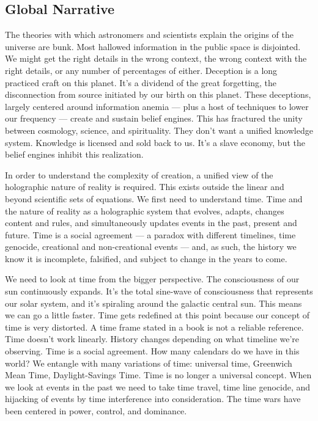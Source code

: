 \subsection{Global Narrative}\label{global-narrative}

The theories with which astronomers and scientists explain the origins
of the universe are bunk. Most hallowed information in the public space
is disjointed. We might get the right details in the wrong context, the
wrong context with the right details, or any number of percentages of
either. Deception is a long practiced craft on this planet. It's a
dividend of the great forgetting, the disconnection from source
initiated by our birth on this planet. These deceptions, largely
centered around information anemia --- plus a host of techniques to
lower our frequency --- create and sustain belief engines. This has
fractured the unity between cosmology, science, and spirituality. They
don't want a unified knowledge system. Knowledge is licensed and sold
back to us. It's a slave economy, but the belief engines inhibit this
realization.

In order to understand the complexity of creation, a unified view of the
holographic nature of reality is required. This exists outside the
linear and beyond scientific sets of equations. We first need to
understand time. Time and the nature of reality as a holographic system
that evolves, adapts, changes content and rules, and simultaneously
updates events in the past, present and future. Time is a social
agreement --- a paradox with different timelines, time genocide,
creational and non-creational events --- and, as such, the history we
know it is incomplete, falsified, and subject to change in the years to
come.

We need to look at time from the bigger perspective. The consciousness
of our sun continuously expands. It's the total sine-wave of
consciousness that represents our solar system, and it's spiraling
around the galactic central sun. This means we can go a little faster.
Time gets redefined at this point because our concept of time is very
distorted. A time frame stated in a book is not a reliable reference.
Time doesn't work linearly. History changes depending on what timeline
we're observing. Time is a social agreement. How many calendars do we
have in this world? We entangle with many variations of time: universal
time, Greenwich Mean Time, Daylight-Savings Time. Time is no longer a
universal concept. When we look at events in the past we need to take
time travel, time line genocide, and hijacking of events by time
interference into consideration. The time wars have been centered in
power, control, and dominance.

